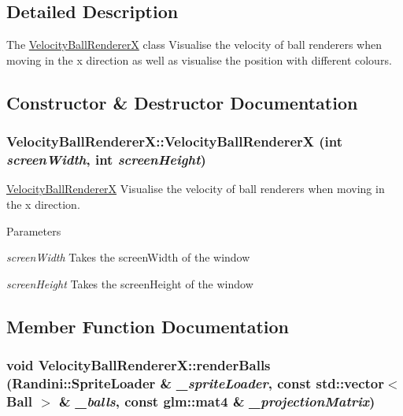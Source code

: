 \subsection{Detailed Description}
The \hyperlink{classVelocityBallRendererX}{VelocityBallRendererX} class Visualise the velocity of ball renderers when moving in the x direction as well as visualise the position with different colours. 

\subsection{Constructor \& Destructor Documentation}
\hypertarget{classVelocityBallRendererX_ad3ae42e2ab2efab70a9812267eb337a7}{
\subsubsection[{VelocityBallRendererX}]{\setlength{\rightskip}{0pt plus 5cm}VelocityBallRendererX::VelocityBallRendererX (int {\em screenWidth}, \/  int {\em screenHeight})}}
\label{classVelocityBallRendererX_ad3ae42e2ab2efab70a9812267eb337a7}


\hyperlink{classVelocityBallRendererX}{VelocityBallRendererX} Visualise the velocity of ball renderers when moving in the x direction. 
\begin{DoxyParams}{Parameters}
\item[{\em screenWidth}]Takes the screenWidth of the window \item[{\em screenHeight}]Takes the screenHeight of the window \end{DoxyParams}


\subsection{Member Function Documentation}
\hypertarget{classVelocityBallRendererX_a36057cc32c5310d711373697acaefec6}{
\subsubsection[{renderBalls}]{\setlength{\rightskip}{0pt plus 5cm}void VelocityBallRendererX::renderBalls ({\bf Randini::SpriteLoader} \& {\em \_\-spriteLoader}, \/  const std::vector$<$ {\bf Ball} $>$ \& {\em \_\-balls}, \/  const glm::mat4 \& {\em \_\-projectionMatrix})}}
\label{classVelocityBallRendererX_a36057cc32c5310d711373697acaefec6}


